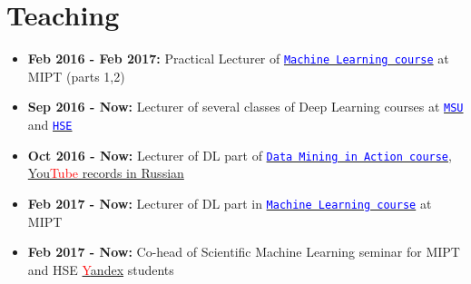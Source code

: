 \documentclass[a4paper,10pt]{article} %
\begin{document}
\section{Teaching}
\begin{itemize}
	\item \textbf{Feb 2016 - Feb 2017:} Practical Lecturer of  \href{https://ml-mipt.github.io/}{\texttt{\textcolor{blue}{Machine Learning course}}} at  MIPT (parts 1,2)
	\item \textbf{Sep 2016 - Now:} Lecturer of several classes of Deep Learning courses at \href{https://goo.gl/3wXB4f}{\texttt{\textcolor{blue}{MSU}}} and \href{https://github.com/yandexdataschool/HSE_deeplearning}{\texttt{\textcolor{blue}{HSE}}}
	\item  \textbf{Oct 2016 - Now:}  Lecturer of DL part of \href{https://vk.com/data_mining_in_action}{\texttt{\textcolor{blue}{Data Mining in Action course}}}, \href{https://www.youtube.com/channel/UCop3CelRVvrchG5lsPyxvHg}{You\textcolor{red}{Tube} records  in Russian \frownie}
	\item  \textbf{Feb 2017 - Now:}  Lecturer of DL part in \href{https://ml-mipt.github.io/}{\texttt{\textcolor{blue}{Machine Learning course}}} at MIPT
	\item  \textbf{Feb 2017 - Now:}  Co-head of Scientific Machine Learning seminar for MIPT and HSE \href{https://yandexdataschool.com/}{\textcolor{red}{Y}andex} students
\end{itemize}
\end{document}
